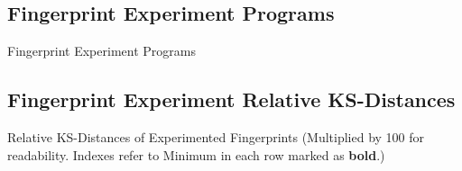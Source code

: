 \newpage
\subsection*{Fingerprint Experiment Programs}
\begin{table}[!ht]
	\centering
	
	\caption{Fingerprint Experiment Programs}
	\label{FingerprintApps}
\end{table}

\subsection*{Fingerprint Experiment Relative KS-Distances}
\begin{sidewaystable}[!ht]
	\footnotesize
	\centering
	
	\caption{
		Relative KS-Distances of Experimented Fingerprints (Multiplied by 100 for readability. Indexes refer to  
		Minimum in each row marked as \textbf{bold}.)
	}
	\label{ksdistances}
\end{sidewaystable}